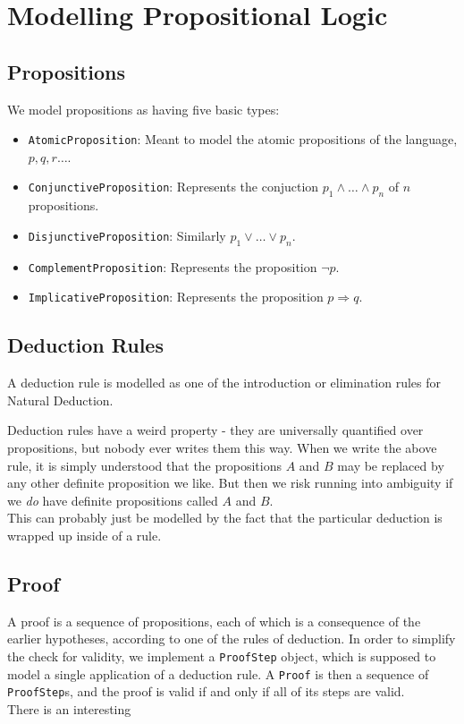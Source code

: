 \documentclass{article}
\begin{document}
	\section*{Modelling Propositional Logic}
	\subsection*{Propositions}
	We model propositions as having five basic types: 
	\begin{itemize}
		\item \texttt{AtomicProposition}: Meant to model the atomic propositions of the language, $p,q,r\ldots$. 
		\item \texttt{ConjunctiveProposition}: Represents the conjuction $p_{1} \wedge \ldots \wedge p_{n}$ of $n$ propositions.
		\item \texttt{DisjunctiveProposition}: Similarly $p_{1} \vee \ldots \vee p_{n}$. 
		\item \texttt{ComplementProposition}: Represents the proposition $\neg p$. 
		\item \texttt{ImplicativeProposition}: Represents the proposition $p \Rightarrow q$. 
	\end{itemize}

	\subsection*{Deduction Rules}
	A deduction rule is modelled as one of the introduction or elimination rules for Natural Deduction. 
	
	\begin{prooftree}
	\end{prooftree}

	Deduction rules have a weird property - they are universally quantified over propositions, but nobody ever writes them this way. When we write the above rule, it is simply understood that the propositions $A$ and $B$ may be replaced by any other definite proposition we like. But then we risk running into ambiguity if we \textit{do} have definite propositions called $A$ and $B$. \\
	
	This can probably just be modelled by the fact that the particular deduction is wrapped up inside of a rule. 
	
	\subsection*{Proof}
	A proof is a sequence of propositions, each of which is a consequence of the earlier hypotheses, according to one of the rules of deduction. In order to simplify the check for validity, we implement a \texttt{ProofStep} object, which is supposed to model a single application of a deduction rule. A \texttt{Proof} is then a sequence of \texttt{ProofStep}s, and the proof is valid if and only if all of its steps are valid. \\
	
	There is an interesting 
\end{document}
